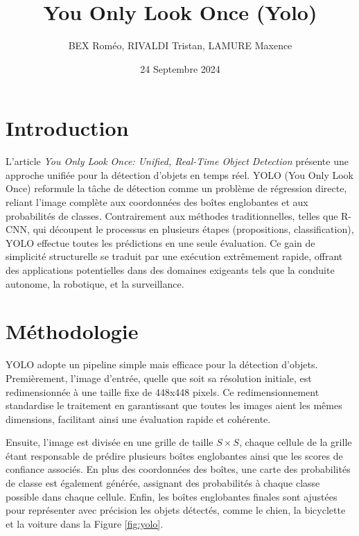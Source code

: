\documentclass[a4paper,11pt]{article}
\title{You Only Look Once (Yolo)}
\author{BEX Roméo, RIVALDI Tristan, LAMURE Maxence}
\date{24 Septembre 2024}
\begin{document}


\newpage

\tableofcontents

\newpage

\section{Introduction}

\indent L’article \textit{You Only Look Once: Unified, Real-Time Object Detection} présente une approche unifiée pour la détection d’objets en temps réel. YOLO (You Only Look Once) reformule la tâche de détection comme un problème de régression directe, reliant l’image complète aux coordonnées des boîtes englobantes et aux probabilités de classes. Contrairement aux méthodes traditionnelles, telles que R-CNN, qui découpent le processus en plusieurs étapes (propositions, classification), YOLO effectue toutes les prédictions en une seule évaluation. Ce gain de simplicité structurelle se traduit par une exécution extrêmement rapide, offrant des applications potentielles dans des domaines exigeants tels que la conduite autonome, la robotique, et la surveillance.

\section{Méthodologie}

\indent YOLO adopte un pipeline simple mais efficace pour la détection d'objets. Premièrement, l'image d'entrée, quelle que soit sa résolution initiale, est redimensionnée à une taille fixe de 448x448 pixels. Ce redimensionnement standardise le traitement en garantissant que toutes les images aient les mêmes dimensions, facilitant ainsi une évaluation rapide et cohérente.

Ensuite, l'image est divisée en une grille de taille $S \times S$, chaque cellule de la grille étant responsable de prédire plusieurs boîtes englobantes ainsi que les scores de confiance associés. En plus des coordonnées des boîtes, une carte des probabilités de classe est également générée, assignant des probabilités à chaque classe possible dans chaque cellule. Enfin, les boîtes englobantes finales sont ajustées pour représenter avec précision les objets détectés, comme le chien, la bicyclette et la voiture dans la Figure \ref{fig:yolo}.
\end{document}
